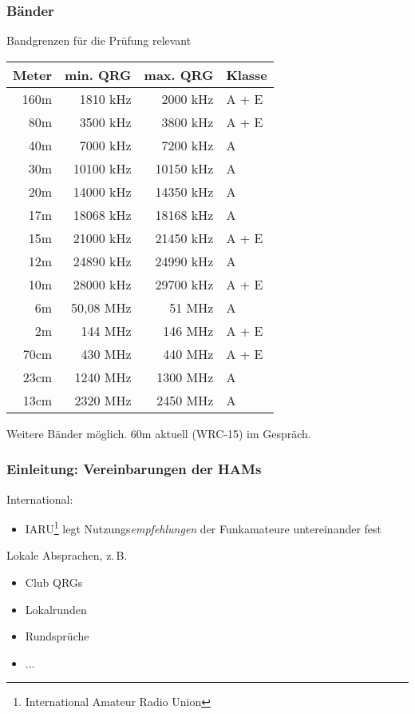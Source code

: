 \begin{frame}
  \frametitle{Bänder}
  Bandgrenzen für die Prüfung relevant

  \begin{center}
  {\footnotesize
  \begin{tabular}{r|r|r|l}\hline
    \textbf{Meter} & \textbf{min. QRG} & \textbf{max. QRG} & \textbf{Klasse} \\\hline\hline
     160m &   1810 kHz &   2000 kHz & A + E \\
      80m &   3500 kHz &   3800 kHz & A + E \\
      40m &   7000 kHz &   7200 kHz & A \\
      30m &  10100 kHz &  10150 kHz & A \\
      20m &  14000 kHz &  14350 kHz & A \\
      17m &  18068 kHz &  18168 kHz & A \\
      15m &  21000 kHz &  21450 kHz & A + E \\
      12m &  24890 kHz &  24990 kHz & A \\
      10m &  28000 kHz &  29700 kHz & A + E \\
       6m &  50,08 MHz &     51 MHz & A \\
       2m &    144 MHz &    146 MHz & A + E \\
     70cm &    430 MHz &    440 MHz & A + E \\
     23cm &   1240 MHz &   1300 MHz & A \\
     13cm &   2320 MHz &   2450 MHz & A \\\hline
  \end{tabular}
  }
  \end{center}

  Weitere Bänder möglich. 60m aktuell (WRC-15) im Gespräch.
\end{frame}


\begin{frame}
    \frametitle{Einleitung: Vereinbarungen der HAMs}

    International:

    \begin{itemize}
        \item IARU\footnote{International Amateur Radio Union} legt
              Nutzungs\emph{empfehlungen} der Funkamateure untereinander fest
    \end{itemize}

    Lokale Absprachen, z.\,B.

    \begin{itemize}
        \item Club QRGs
        \item Lokalrunden
        \item Rundsprüche
        \item ...
    \end{itemize}

\end{frame}

